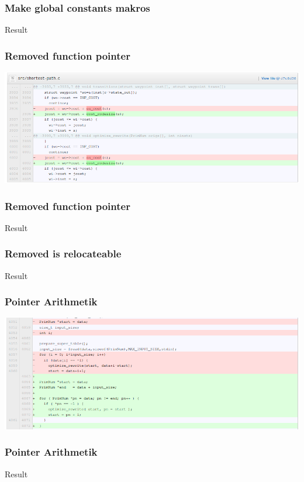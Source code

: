 \documentclass{beamer}
\begin{document}
\begin{frame}\frametitle{Make global constants makros}
\begin{center}
Result
\end{center}
\end{frame}

\begin{frame}\frametitle{Removed function pointer}
\begin{center}
\includegraphics[scale=0.4]{shots/fp.png}
\end{center}
\end{frame}

\begin{frame}\frametitle{Removed function pointer}
\begin{center}
Result
\end{center}
\end{frame}

\begin{frame}\frametitle{Removed is relocateable}
\begin{center}
Result
\end{center}
\end{frame}

\begin{frame}\frametitle{Pointer Arithmetik}
\begin{center}
\includegraphics[scale=0.4]{shots/pointer_arith.png}
\end{center}
\end{frame}

\begin{frame}\frametitle{Pointer Arithmetik}
\begin{center}
Result
\end{center}
\end{frame}
\end{document}
